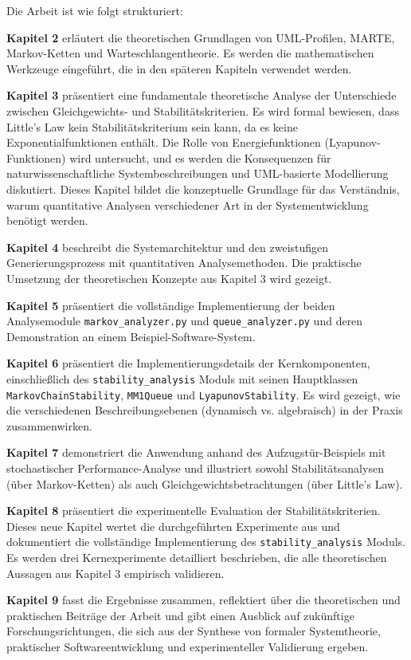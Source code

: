 ﻿\documentclass[a4paper,12pt]{scrreprt}
\theoremstyle{definition}
\begin{document}
Die Arbeit ist wie folgt strukturiert:

\textbf{Kapitel 2} erläutert die theoretischen Grundlagen von UML-Profilen, MARTE, Markov-Ketten und Warteschlangentheorie. Es werden die mathematischen Werkzeuge eingeführt, die in den späteren Kapiteln verwendet werden.

\textbf{Kapitel 3} präsentiert eine fundamentale theoretische Analyse der Unterschiede zwischen Gleichgewichts- und Stabilitätskriterien. Es wird formal bewiesen, dass Little's Law kein Stabilitätskriterium sein kann, da es keine Exponentialfunktionen enthält. Die Rolle von Energiefunktionen (Lyapunov-Funktionen) wird untersucht, und es werden die Konsequenzen für naturwissenschaftliche Systembeschreibungen und UML-basierte Modellierung diskutiert. Dieses Kapitel bildet die konzeptuelle Grundlage für das Verständnis, warum quantitative Analysen verschiedener Art in der Systementwicklung benötigt werden.

\textbf{Kapitel 4} beschreibt die Systemarchitektur und den zweistufigen Generierungsprozess mit quantitativen Analysemethoden. Die praktische Umsetzung der theoretischen Konzepte aus Kapitel 3 wird gezeigt.

\textbf{Kapitel 5} präsentiert die vollständige Implementierung der beiden
Analysemodule \texttt{markov\_analyzer.py} und \texttt{queue\_analyzer.py}
und deren Demonstration an einem Beispiel-Software-System.

\textbf{Kapitel 6} präsentiert die Implementierungsdetails der Kernkomponenten, einschließlich des \texttt{stability\_analysis} Moduls mit seinen Hauptklassen \texttt{MarkovChainStability}, \texttt{MM1Queue} und \texttt{LyapunovStability}. Es wird gezeigt, wie die verschiedenen Beschreibungsebenen (dynamisch vs. algebraisch) in der Praxis zusammenwirken.

\textbf{Kapitel 7} demonstriert die Anwendung anhand des Aufzugstür-Beispiels mit stochastischer Performance-Analyse und illustriert sowohl Stabilitätsanalysen (über Markov-Ketten) als auch Gleichgewichtsbetrachtungen (über Little's Law).

\textbf{Kapitel 8} präsentiert die experimentelle Evaluation der Stabilitätskriterien. Dieses neue Kapitel wertet die durchgeführten Experimente aus und dokumentiert die vollständige Implementierung des \texttt{stability\_analysis} Moduls. Es werden drei Kernexperimente detailliert beschrieben, die alle theoretischen Aussagen aus Kapitel 3 empirisch validieren.

\textbf{Kapitel 9} fasst die Ergebnisse zusammen, reflektiert über die theoretischen und praktischen Beiträge der Arbeit und gibt einen Ausblick auf zukünftige Forschungsrichtungen, die sich aus der Synthese von formaler Systemtheorie, praktischer Softwareentwicklung und experimenteller Validierung ergeben.
\end{document}
